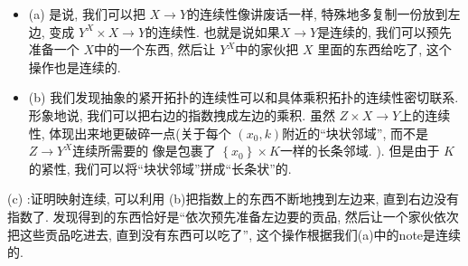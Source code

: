 \documentclass[../main.tex]{subfiles}
\begin{document}
\begin{note}
    \begin{itemize}
        \item (a) 是说, 我们可以把 \(  X\to Y  \)的连续性像讲废话一样, 特殊地多复制一份放到左边, 变成 \(  Y^{X}  \times X\to Y\)的连续性.  也就是说如果\(  X\to Y  \)是连续的, 我们可以预先准备一个 \(  X  \)中的一个东西, 然后让 \(  Y^{X}  \)中的家伙把 \(  X \)   里面的东西给吃了, 这个操作也是连续的.
        \item (b) 我们发现抽象的紧开拓扑的连续性可以和具体乘积拓扑的连续性密切联系. 形象地说, 我们可以把右边的指数拽成左边的乘积. 虽然 \(  Z\times X\to Y  \)上的连续性, 体现出来地更破碎一点(关于每个 \(  \left( x_0,k \right)   \)附近的``块状邻域'', 而不是 \(  Z\to Y^{X}  \)连续所需要的 像是包裹了 \(  \left\{ x_0 \right\}\times K  \)一样的长条邻域. ). 但是由于 \(  K  \)的紧性, 我们可以将``块状邻域''拼成``长条状''的. 
    \end{itemize}
    
\end{note}
\begin{proofsketch}
    (c) :证明映射连续, 可以利用 (b)把指数上的东西不断地拽到左边来, 直到右边没有指数了. 发现得到的东西恰好是``依次预先准备左边要的贡品, 然后让一个家伙依次把这些贡品吃进去, 直到没有东西可以吃了'', 这个操作根据我们(a)中的note是连续的.
\end{proofsketch}
\end{document}
